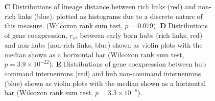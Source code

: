 \documentclass[10pt,letterpaper]{article}
\begin{document}
{\begin{figure}[!h]
{%
\textbf{C} Distributions of lineage distance between rich links (red) and non-rich links (blue), plotted as histograms due to a discrete nature of this measure. (Wilcoxon rank sum test, $p = 0.079$).
\textbf{D} Distributions of gene coexpression, $r_\phi$, between early born hubs (rich links, red) and non-hubs (non-rich links, blue) shown as violin plots with the median shown as a horizontal bar (Wilcoxon rank sum test, $p = 3.9 \times 10^{-22}$).
\textbf{E} Distributions of gene coexpression between hub command interneurons (red) and hub non-command interneurons (blue) shown as violin plots with the median shown as a horizontal bar (Wilcoxon rank sum test, $p = 3.3 \times 10^{-8}$).
}
 \label{fig:OtherInfluences}
\end{figure}


}
\end{document}
